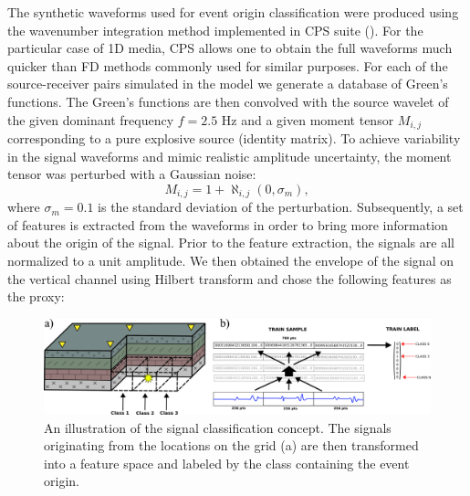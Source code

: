 \documentclass[letterpaper,11pt]{article}
\begin{document}
The synthetic waveforms used for event origin classification were produced using the wavenumber integration method implemented in CPS suite (\cite{herrmann_computer_2013}). For the particular case of 1D media, CPS allows one to obtain the full waveforms much quicker than FD methods commonly used for similar purposes. For each of the source-receiver pairs simulated in the model we generate a database of Green's functions. The Green's functions are then convolved with the source wavelet of the given dominant frequency $f=2.5$ Hz and a given moment tensor $M_{i,j}$ corresponding to a pure explosive source (identity matrix). To achieve variability in the signal waveforms and mimic realistic amplitude uncertainty, the moment tensor was perturbed with a Gaussian noise:
\begin{equation}
 M_{i,j} = 1 + \aleph_{i,j}(0,\sigma_{m}),
\end{equation}
where $\sigma_{m} = 0.1$ is the standard deviation of the perturbation. Subsequently, a set of features is extracted from the waveforms in order to bring more information about the origin of the signal. Prior to the feature extraction, the signals are all normalized to a unit amplitude. We then obtained the envelope of the signal on the vertical channel using Hilbert transform and chose the following features as the proxy:
\begin{figure}[htb]
\begin{center}
\includegraphics[width=0.7\linewidth,angle=0]{./AntonBiryukov_bibtex/classes.png}
\end{center}
\vspace{-4mm}
\caption{An illustration of the signal classification concept. The signals originating from the locations on the grid (a) are then transformed into a feature space and labeled by the class containing the event origin.}
\label{fig:classes}
\end{figure}
\end{document}
